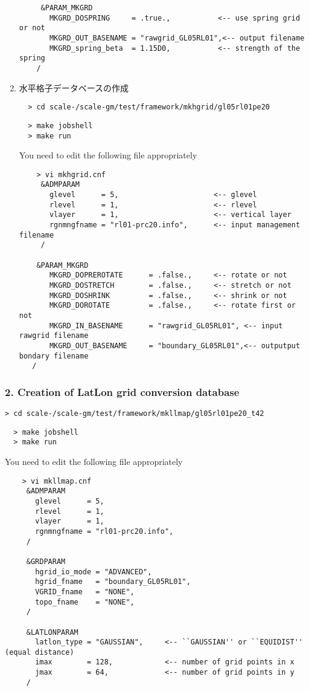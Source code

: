 \begin{enumerate}
\begin{verbatim}
     &PARAM_MKGRD
       MKGRD_DOSPRING     = .true.,           <-- use spring grid or not
       MKGRD_OUT_BASENAME = "rawgrid_GL05RL01",<-- output filename
       MKGRD_spring_beta  = 1.15D0,           <-- strength of the spring
    /
 \end{verbatim}


\item{水平格子データベースの作成}

\verb|  > cd scale-|{\version}\verb|/scale-gm/test/framework/mkhgrid/gl05rl01pe20|
\vspace{-4mm}
\begin{verbatim}
  > make jobshell
  > make run
\end{verbatim}
You need to edit the following file appropriately
 \begin{verbatim}
    > vi mkhgrid.cnf
     &ADMPARAM
       glevel      = 5,                      <-- glevel
       rlevel      = 1,                      <-- rlevel
       vlayer      = 1,                      <-- vertical layer
       rgnmngfname = "rl01-prc20.info",      <-- input management filename
     /

    &PARAM_MKGRD
       MKGRD_DOPREROTATE      = .false.,     <-- rotate or not
       MKGRD_DOSTRETCH        = .false.,     <-- stretch or not
       MKGRD_DOSHRINK         = .false.,     <-- shrink or not
       MKGRD_DOROTATE         = .false.,     <-- rotate first or not
       MKGRD_IN_BASENAME      = "rawgrid_GL05RL01", <-- input rawgrid filename
       MKGRD_OUT_BASENAME     = "boundary_GL05RL01",<-- outputput bondary filename
   /
\end{verbatim}
\end{enumerate}

\subsubsection{2. Creation of LatLon grid conversion database}

\verb|> cd scale-|{\version}\verb|/scale-gm/test/framework/mkllmap/gl05rl01pe20_t42|
\vspace{-3mm}
\begin{verbatim}
  > make jobshell
  > make run
\end{verbatim}
You need to edit the following file appropriately
 \begin{verbatim}
    > vi mkllmap.cnf
     &ADMPARAM
       glevel      = 5,
       rlevel      = 1,
       vlayer      = 1,
       rgnmngfname = "rl01-prc20.info",
     /

     &GRDPARAM
       hgrid_io_mode = "ADVANCED",
       hgrid_fname   = "boundary_GL05RL01",
       VGRID_fname   = "NONE",
       topo_fname    = "NONE",
     /

     &LATLONPARAM
       latlon_type = "GAUSSIAN",     <-- ``GAUSSIAN'' or ``EQUIDIST'' (equal distance)
       imax        = 128,            <-- number of grid points in x
       jmax        = 64,             <-- number of grid points in y
     /
 \end{verbatim}



